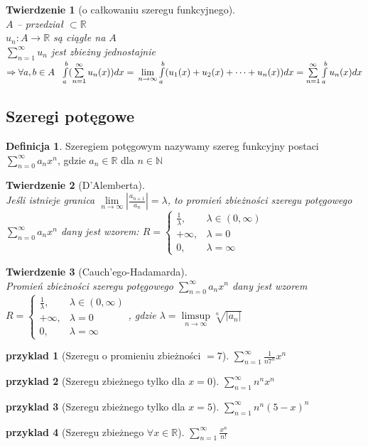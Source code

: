 \documentclass[12pt,a4paper]{article}
\newtheorem{tw}{Twierdzenie}
\newtheorem{przyklad}{przyklad}
\theoremstyle{definition}
\newtheorem{df}{Definicja}
\begin{document}
\begin{tw}[o całkowaniu szeregu funkcyjnego]~\\
$A$ -- przedział $\subset \mathbb{R}$\\
$u_n: A \to \mathbb{R}$ są ciągłe na $A$\\
$\sum\limits_{n=1}^\infty u_n$ jest zbieżny jednostajnie
$ \Rightarrow \forall a,b\in A ~~ \int\limits_a^b (\sum\limits_{n=1}^\infty u_n(x))dx =\\ \lim\limits_{n\to\infty}\int\limits_a^b (u_1(x) + u_2(x) + \dots + u_n(x))dx =  \sum\limits_{n=1}^\infty \int\limits_a^b u_n(x)dx$
\end{tw}

\subsection{Szeregi potęgowe}
\begin{df}
Szeregiem potęgowym nazywamy szereg funkcyjny postaci $\sum\limits_{n=0}^\infty a_nx^n$, gdzie $a_n\in\mathbb{R}$ dla $n\in\mathbb{N}$ 
\end{df}

\begin{tw}[D'Alemberta]~\\
Jeśli istnieje granica $\lim\limits_{n\to\infty} |\frac{a_{n+1}}{a_n}| = \lambda $, to promień zbieżności szeregu potęgowego $\sum\limits_{n=0}^\infty a_nx^n$ dany jest wzorem:
$ R = 
	\begin{cases}
		\frac{1}{\lambda}, & \lambda \in (0,\infty)\\
		+\infty, & \lambda = 0\\
		0, & \lambda = \infty
	\end{cases} $
\end{tw}

\begin{tw}[Cauch'ego-Hadamarda]~\\
Promień zbieżności szeregu potęgowego $\sum\limits_{n=0}^\infty a_nx^n$ dany jest wzorem 
$ R = 
	\begin{cases}
		\frac{1}{\lambda}, & \lambda \in (0,\infty)\\
		+\infty, & \lambda = 0\\
		0, & \lambda = \infty
	\end{cases} $, gdzie $\lambda = \limsup\limits_{n\to\infty}\sqrt[n]{|a_n|}$
\end{tw}

\begin{przyklad}[Szeregu o promieniu zbieżności $= 7$]
$\sum\limits_{n=1}^\infty \frac{1}{n7^n}x^n$
\end{przyklad}
\begin{przyklad}[Szeregu zbieżnego tylko dla $x=0$]
$\sum\limits_{n=1}^\infty n^nx^n$
\end{przyklad}
\begin{przyklad}[Szeregu zbieżnego tylko dla $x=5$]
$\sum\limits_{n=1}^\infty n^n(5-x)^n$
\end{przyklad}
\begin{przyklad}[Szeregu zbieżnego $\forall x\in\mathbb{R}$]
$\sum\limits_{n=1}^\infty \frac{x^n}{n!}$
\end{przyklad}
\end{document}
